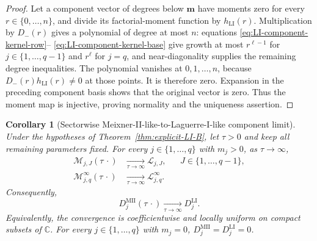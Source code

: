 \documentclass[10pt]{amsart}
\newcommand{\mm}{\boldsymbol m}
\theoremstyle{plain}
\newtheorem{corollary}[theorem]{Corollary}
\theoremstyle{definition}
\theoremstyle{remark}
\begin{document}
\begin{proof}
Let a component vector of degrees below \(\mm\) have moments zero for
every \(r\in\{0,\ldots,n\}\), and divide its factorial-moment function by
\(h_{\mathrm{LI}}(r)\). Multiplication by \(D_-(r)\) gives a polynomial
of degree at most \(n\): equations
\eqref{eq:LI-component-kernel-row}--
\eqref{eq:LI-component-kernel-base} give growth at most
\(r^{\ell-1}\) for \(j\in\{1,\ldots,q-1\}\) and \(r^\ell\) for
\(j=q\), and
near-diagonality supplies the remaining degree inequalities.  The
polynomial vanishes at \(0,1,\ldots,n\), because
\(D_-(r)h_{\mathrm{LI}}(r)\ne0\) at those points.  It is therefore zero.
Expansion in the preceding component basis shows that the original
vector is zero.  Thus the moment map is injective, proving normality and
the uniqueness assertion.
\end{proof}

\begin{corollary}[Sectorwise Meixner-II-like-to-Laguerre-I-like component limit]
\label{cor:MII-LI-component-limit}
Under the hypotheses of Theorem~\ref{thm:explicit-LI-B}, let \(\tau>0\)
and keep all remaining parameters fixed. For every
\(j\in\{1,\ldots,q\}\) with \(m_j>0\), as \(\tau\to\infty\),
\begin{align}
 \mathscr M_{j,J}(\tau\,\cdot)
 &\xrightarrow[\tau\to\infty]{}\mathscr L_{j,J},
 &&J\in\{1,\ldots,q-1\},
 \label{eq:MII-LI-finite-sector-limit}\\
 \mathscr M_{j,q}^{\infty}(\tau\,\cdot)
 &\xrightarrow[\tau\to\infty]{}\mathscr L_{j,q}^{\infty}.
 \label{eq:MII-LI-infinity-sector-limit}
\end{align}
Consequently,
\begin{equation}
 D_j^{\mathrm{MII}}(\tau\,\cdot)
 \xrightarrow[\tau\to\infty]{}D_j^{\mathrm{LI}}.
 \label{eq:MII-LI-component-limit}
\end{equation}
Equivalently, the convergence is coefficientwise and locally uniform on
compact subsets of \(\mathbb C\). For every
\(j\in\{1,\ldots,q\}\) with \(m_j=0\),
\(D_j^{\mathrm{MII}}=D_j^{\mathrm{LI}}=0\).
\end{corollary}
\end{document}
